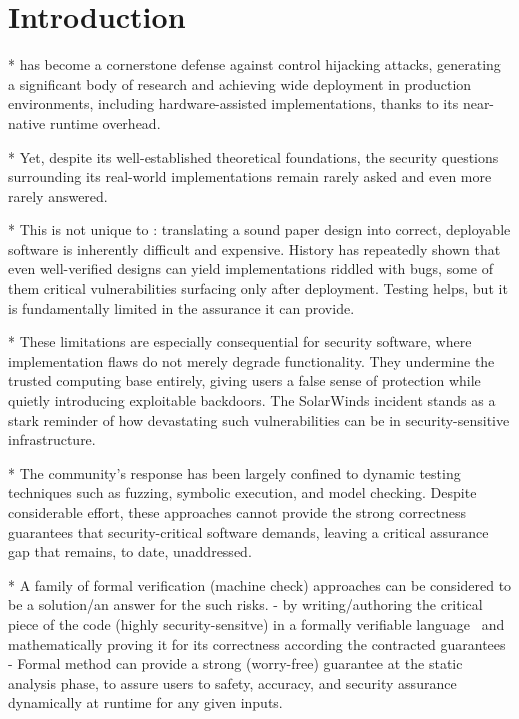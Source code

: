 \section{Introduction}


* \cfi has become a cornerstone defense against control hijacking attacks, generating a significant body of research and achieving wide deployment in production environments, including hardware-assisted implementations, thanks to its near-native runtime overhead.

* Yet, despite its well-established theoretical foundations, the security questions surrounding its real-world implementations remain rarely asked and even more rarely answered.

* This is not unique to \cfi: translating a sound paper design into correct, deployable software is inherently difficult and expensive. History has repeatedly shown that even well-verified designs can yield implementations riddled with bugs, some of them critical vulnerabilities surfacing only after deployment. Testing helps, but it is fundamentally limited in the assurance it can provide.


* These limitations are especially consequential for security software, where implementation flaws do not merely degrade functionality. They undermine the trusted computing base entirely, giving users a false sense of protection while quietly introducing exploitable backdoors. The SolarWinds incident stands as a stark reminder of how devastating such vulnerabilities can be in security-sensitive infrastructure.

* The community's response has been largely confined to dynamic testing techniques such as fuzzing, symbolic execution, and model checking. Despite considerable effort, these approaches cannot provide the strong correctness guarantees that security-critical software demands, leaving a critical assurance gap that remains, to date, unaddressed.

* A family of formal verification (machine check) approaches can be considered to be a solution/an answer for the such risks.
  - by writing/authoring the critical piece of the code (highly security-sensitve) in a formally verifiable language~\cite{coq,hol} and mathematically proving it for its correctness according the contracted guarantees
  - Formal method can provide a strong (worry-free) guarantee at the static analysis phase, to assure users to safety, accuracy, and security assurance dynamically at runtime for any given inputs.



